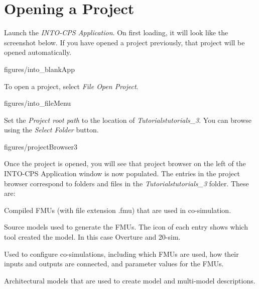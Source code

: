 \documentclass[11pt,a4paper]{../tutorial}
\begin{document}
\newpage

\section{Opening a Project}
\begin{instructions}
\item Launch the \emph{INTO-CPS Application}. On first loading, it will look like the screenshot below. If you have opened a project previously, that project will be opened automatically.

\begin{annotation}[width=0.85\linewidth,trim=0 150 0 0,clip]{figures/into_blankApp}
    \end{annotation}


\item To open a project, select \emph{File \menusep Open Project}.

\begin{annotation}[width=0.85\linewidth,trim=0 260 0 0,clip]{figures/into_fileMenu}
    \end{annotation}

\newpage

\item Set the \emph{Project root path} to the location of \emph{Tutorials\pathsep{}tutorials\_3}. You can browse using the \emph{Select Folder} button.

\begin{annotation}[width=0.85\linewidth]{figures/projectBrowser3}
\end{annotation}

\newpage
\item Once the project is opened, you will see that project browser on the left of the INTO-CPS Application window is now populated. The entries in the project browser correspond to folders and files in the \emph{Tutorials\pathsep{}tutorials\_3} folder. These are:

    \begin{description}[noitemsep]
        \item[FMUs] Compiled FMUs (with file extension .fmu) that are used in co-simulation.
        \item[Models] Source models used to generate the FMUs. The icon of each entry shows which tool created the model. In this case Overture and 20-sim.
        \item[Multi-models] Used to configure co-simulations, including which FMUs are used, how their inputs and outputs are connected, and parameter values for the FMUs.
        \item[SysML] Architectural models that are used to create model and multi-model descriptions.
    \end{description}


\end{instructions}
\end{document}
